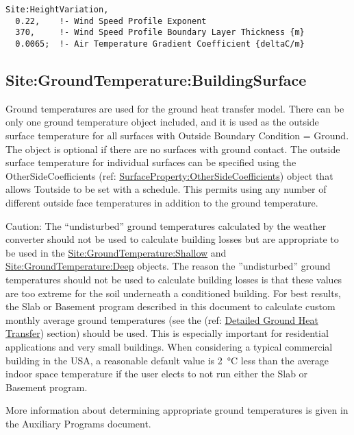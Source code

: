 \begin{lstlisting}
Site:HeightVariation,
  0.22,    !- Wind Speed Profile Exponent
  370,     !- Wind Speed Profile Boundary Layer Thickness {m}
  0.0065;  !- Air Temperature Gradient Coefficient {deltaC/m}
\end{lstlisting}

\subsection{Site:GroundTemperature:BuildingSurface}\label{sitegroundtemperaturebuildingsurface}

Ground temperatures are used for the ground heat transfer model. There can be only one ground temperature object included, and it is used as the outside surface temperature for all surfaces with Outside Boundary Condition = Ground. The object is optional if there are no surfaces with ground contact. The outside surface temperature for individual surfaces can be specified using the OtherSideCoefficients (ref: \hyperref[surfacepropertyothersidecoefficients]{SurfaceProperty:OtherSideCoefficients}) object that allows Toutside to be set with a schedule. This permits using any number of different outside face temperatures in addition to the ground temperature.

\begin{callout}
Caution: The ``undisturbed'' ground temperatures calculated by the weather converter should not be used to calculate building losses but are appropriate to be used in the \hyperref[sitegroundtemperatureshallow]{Site:GroundTemperature:Shallow} and \hyperref[sitegroundtemperaturedeep]{Site:GroundTemperature:Deep} objects. The reason the ''undisturbed'' ground temperatures should not be used to calculate building losses is that these values are too extreme for the soil underneath a conditioned building. For best results, the Slab or Basement program described in this document to calculate custom monthly average ground temperatures (see the (ref: \hyperref[group-detailed-ground-heat-transfer] {Detailed Ground Heat Transfer}) section) should be used. This is especially important for residential applications and very small buildings. When considering a typical commercial building in the USA, a reasonable default value is \SI{2}{\degreeCelsius} less than the average indoor space temperature if the user elects to not run either the Slab or Basement program.
\end{callout}

More information about determining appropriate ground temperatures is given in the Auxiliary Programs document.

